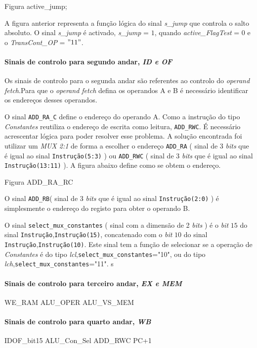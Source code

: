 \documentclass[11pt]{article}
\numberwithin{equation}{section}
\begin{document}
 	Figura active\_jump;
 	
 	A figura anterior representa a função lógica do sinal \textit{s\_jump} que controla o salto absoluto. O sinal \textit{s\_jump} é activado, \textit{s\_jump} = $1$, quando \textit{active\_FlagTest} = $0$ e o \textit{TransCont\_OP} = $"11"$.
 	
 	
\paragraph{Sinais de controlo para segundo andar, \textit{ID e OF}}

Os sinais de controlo para o segunda andar são referentes ao controlo do \textit{operand fetch}.Para que o \textit{operand fetch} defina os operandos A e B é necessário identificar os endereços desses operandos.

	O sinal \texttt{ADD\_RA\_C} define o endereço do operando A. Como a instrução do tipo \textit{Constantes} reutiliza o endereço de escrita como leitura, \texttt{ADD\_RWC}. É necessário acrescentar lógica para poder resolver esse problema. A solução encontrada foi utilizar um \textit{MUX 2:1} de forma a escolher o endereço \texttt{ADD\_RA} ( sinal de 3 \textit{bits} que é igual ao sinal \texttt{Instrução(5:3)} ) ou \texttt{ADD\_RWC} ( sinal de 3 \textit{bits} que é igual ao sinal \texttt{Instrução(13:11)} ). A figura abaixo define como se obtem o endereço.
	
	Figura ADD\_RA\_RC
	
	O sinal \texttt{ADD\_RB}( sinal de 3 \textit{bits} que é igual ao sinal \texttt{Instrução(2:0)} ) é simplesmente o endereço do registo para obter o operando B. 
	
	O sinal \texttt{select\_mux\_constantes} ( sinal com a dimensão de 2 \textit{bits} ) é o \textit{bit} $15$ do sinal \texttt{Instrução},\texttt{Instrução(15)}, concatenado com o \textit{bit} $10$ do sinal \texttt{Instrução},\texttt{Instrução(10)}. Este sinal tem a função de selecionar se a operação de \textit{Constantes} é do tipo \textit{lcl},\texttt{select\_mux\_constantes}="10", ou do tipo \textit{lch},\texttt{select\_mux\_constantes}="11".
		s

\paragraph{Sinais de controlo para terceiro andar, \textit{EX e MEM}}
WE\_RAM ALU\_OPER ALU\_VS\_MEM 
\paragraph{Sinais de controlo para quarto andar, \textit{WB}}
	IDOF\_bit15 ALU\_Con\_Sel ADD\_RWC PC+1
\end{document}
